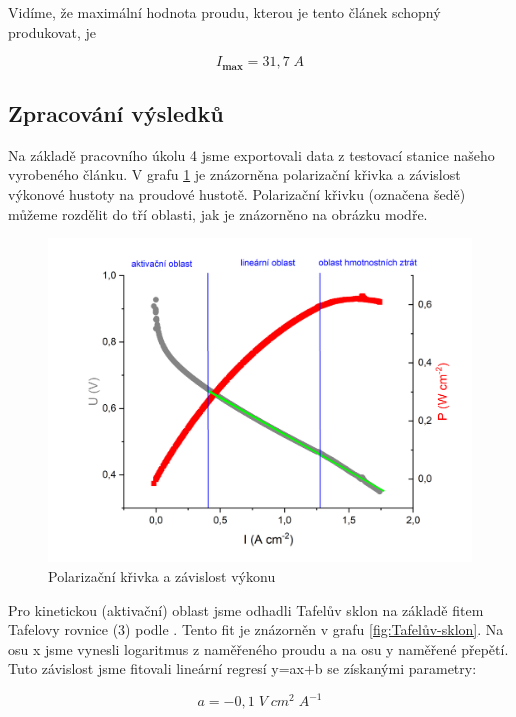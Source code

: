Vidíme, že maximální hodnota proudu, kterou je tento článek schopný produkovat, je

\begin{equation}
    I_\textbf{max} = 31,7 \; A
\end{equation}

\subsection{Zpracování výsledků}

Na základě pracovního úkolu 4 jsme exportovali data z testovací stanice našeho vyrobeného článku. V grafu \ref{fig:polar-krivk} je znázorněna polarizační křivka a závislost výkonové hustoty na proudové hustotě. Polarizační křivku (označena šedě) můžeme rozdělit do tří oblasti, jak je znázorněno na obrázku modře.


\begin{figure}[!h]
    \centering
    \includegraphics[width=1\linewidth]{H1 - vodíkový palivový článek/Polarizační křivka.png}
    \caption{Polarizační křivka a závislost výkonu}
    \label{fig:polar-krivk}
\end{figure}

Pro kinetickou (aktivační) oblast jsme odhadli Tafelův sklon na základě fitem Tafelovy rovnice (3) podle \cite{bib:studijni-text}. Tento fit je znázorněn v grafu \ref{fig:Tafelův-sklon}. Na osu x jsme vynesli logaritmus z naměřeného proudu a na osu y naměřené přepětí. Tuto závislost jsme fitovali lineární regresí y=ax+b se získanými parametry:

\begin{equation}
    a = -0,1 \; V \; cm^2 \; A^{-1}
\end{equation}

